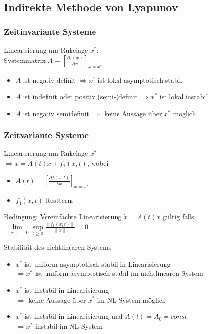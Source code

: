 \documentclass[german]{latex4ei/latex4ei_sheet}
\begin{document}
\begin{sectionbox}
\subsection{Indirekte Methode von Lyapunov}

\subsubsection{Zeitinvariante Systeme}
Linearisierung um Ruhelage $x^*$:\\
Systemmatrix $A = \left[ \frac{\partial \underline{f}(\underline{x})}{\partial \underline{x}} \right]_{x=x^*}$
\begin{itemize}
  \item $A$ ist negativ definit $\Rightarrow x^*$ ist lokal asymptotisch stabil
  \item $A$ ist indefinit oder positiv (semi-)definit $\Rightarrow x^*$ ist lokal instabil
  \item $A$ ist negativ semidefinit $\Rightarrow$ keine Aussage über $x^*$ möglich
\end{itemize}

\subsubsection{Zeitvariante Systeme}
Linearisierung um Ruhelage $x^*$ \\
$\Rightarrow \dot{x} = A(t) x + f_1(x,t)$, wobei \\
\begin{itemize}
  \item $A(t) = \left[ \frac{\partial f(x,t)}{\partial x} \right]_{x=x^*}$
  \item $f_1(x,t)$ Restterm
\end{itemize}

Bedingung: Vereinfachte Linearisierung $\dot{x}  = A(t) x$ gültig falls: \\
$\lim\limits_{\|x\| \rightarrow 0} \sup\limits_{t \geq 0} \frac{\|f_1(x,t)\|}{\|x\|} = 0$

Stabilität des nichtlinearen Systems
\begin{itemize}
  \item $x^*$ ist uniform asymptotisch stabil in Linearisierung \\
    $\Rightarrow x^*$ ist uniform asymptotisch stabil im nichtlinearen System
  \item $x^*$ ist instabil in Linearisierung \\
    $\Rightarrow$ keine Aussage über $x^*$ im NL System möglich
  \item $x^*$ ist instabil in Linearisierung und $A(t) = A_0 = const$ \\
    $\Rightarrow x^*$ instabil im NL System
\end{itemize}


\end{sectionbox}
\end{document}
